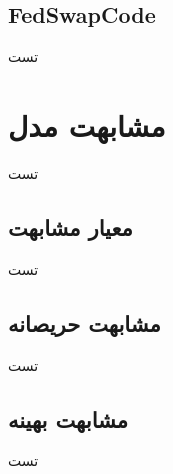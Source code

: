\subsection{FedSwapCode}
تست

\section{مشابهت مدل}
تست

\subsection{معیار مشابهت}
تست

\subsection{مشابهت حریصانه}
تست

\subsection{مشابهت بهینه}
تست





